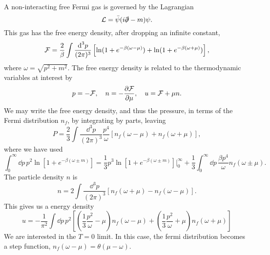 A non-interacting free Fermi gas is governed by the Lagrangian
%
\begin{equation}
    \mathcal{L} = \bar \psi (i \slashed \partial - m) \psi.
\end{equation}
%
This gas has the free energy density, after dropping an infinite constant, 
%
\begin{equation}
    \mathcal{F} = \frac{2}{\beta}\int \frac{\text{d}^3 p}{(2 \pi)^3} \left[
        \ln(1 + e^{-\beta(\omega - \mu)})
        + 
        \ln(1 + e^{-\beta(\omega + \mu)})
    \right],
\end{equation}
%
where $\omega = \sqrt{p^2 + m^2}$.
The free energy density is related to the thermodynamic variables at interest by
%
\begin{equation}
    p = - \Eff, \quad n = - \diffp{\Eff}{\mu}, \quad u = \Eff + \mu n.
\end{equation}
%
We may write the free energy density, and thus the pressure, in terms of the Fermi distribution $n_f$, by integrating by parts, leaving
%
\begin{equation}
    P = \frac{2}{3}\int \frac{\dd^3 p}{(2 \pi)^3} 
    \frac{p^4}{\omega}
    [n_f(\omega - \mu) + n_f(\omega + \mu)],
\end{equation}
%
where we have used 
%
\begin{equation}
    \int_0^\infty \dd p \, p^2 \ln\left[1 + e^{-\beta(\omega \pm m)}\right]
    = 
    \frac{1}{3} p^3\ln\left[1 + e^{-\beta(\omega \pm m)}\right] \bigg |_0^\infty
    + \frac{1}{3} \int_0^\infty \dd p \, \frac{ \beta p^4}{\omega}n_f(\omega \pm \mu).
\end{equation}
%
The particle density $n$ is
%
\begin{equation}
    n = 2 \int \frac{\dd^3 p}{(2 \pi)^3}
    \left[
        n_f(\omega + \mu)
        -
        n_f(\omega - \mu)
    \right].
\end{equation}
%
This gives us a energy density
%
\begin{equation}
    u
    =
    -\frac{1}{\pi^2}
    \int \dd p \,
    p^2
    \left[
        \left(
            \frac{1}{3}
            \frac{p^2}{\omega}
            -
            \mu
        \right)
        n_f(\omega - \mu)
        +
        \left(
            \frac{1}{3}
            \frac{p^2}{\omega}
            +
            \mu
        \right)
        n_f(\omega + \mu)
    \right]
\end{equation}
%
We are interested in the $T = 0$ limit.
In this case, the fermi distribution becomes a step function, $n_f(\omega - \mu) = \theta(\mu - \omega)$.
